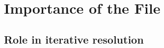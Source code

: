 \section{Importance of the  File}\label{sec:root-hints}


\subsection{Role in iterative resolution}\label{sec:root-hints-role}
